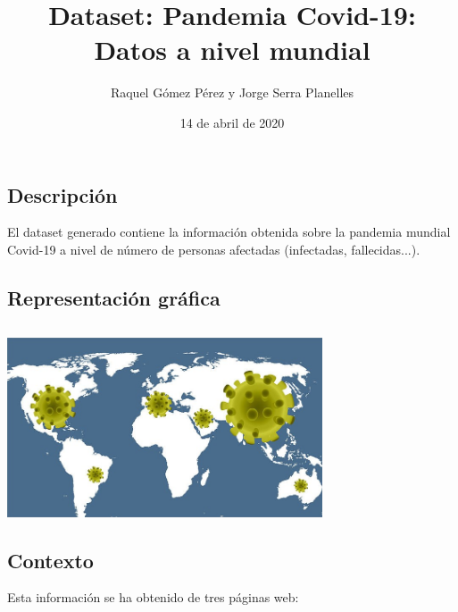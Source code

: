 \documentclass[]{article}
\title{Dataset: Pandemia Covid-19: Datos a nivel mundial}
\author{Raquel Gómez Pérez y Jorge Serra Planelles}
\date{14 de abril de 2020}
\begin{document}
\maketitle

\hypertarget{descripcian}{%
\subsection{Descripción}\label{descripcian}}
El dataset generado contiene la información obtenida sobre la pandemia mundial Covid-19 a nivel de número de personas afectadas (infectadas, fallecidas...).

\hypertarget{imagen-identificativa}{%
\subsection{Representación gráfica}\label{imagen-identificativa}}
\subsection{}\label{imagen}
  	\begin{center}
  	\includegraphics[width=0.7\textwidth]{covid}
	\end{center}
	
\hypertarget{contexto}{%
\subsection{Contexto}\label{contexto}}
Esta información se ha obtenido de tres páginas web:
\end{document}
